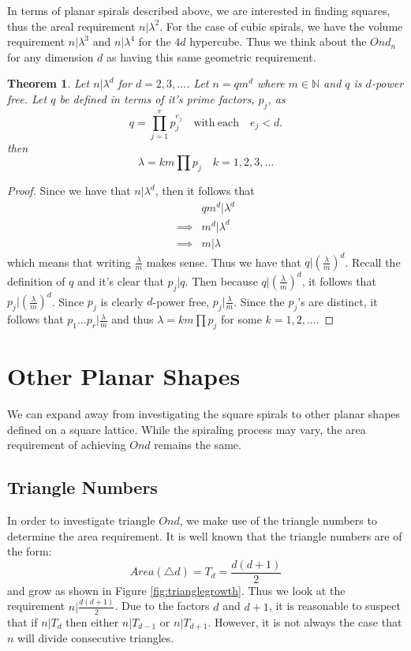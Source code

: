 \documentclass[11pt,reqno]{amsart}
\theoremstyle{mydef}
\newtheorem{thm}{Theorem}[section]
\begin{document}
In terms of planar spirals described above, we are interested
in finding squares, thus the areal requirement $n \vert \lambda^2$. For the case
of cubic spirals, we have the volume requirement $n \vert \lambda^3$ and $n 
\vert \lambda^4$ for the $4d$ hypercube. Thus we think about the $Ond_n$ for any 
dimension $d$ as having this same geometric requirement.

\begin{thm}
\label{dimdthm}
Let $n\vert \lambda^d$ for $d=2, 3, \ldots$. Let $n = qm^d$ where $m \in \mathbb{N}$ and $q$ is $d$-power 
free. Let $q$ be defined in terms of it's prime factors, $p_j$, as
\[
	q = \prod\limits_{j=1}^{r} p_j^{e_j}\quad \text{with}\ \text{each}\quad e_j < d.
\]
then
\[
	\lambda = k m \prod p_j \quad k = 1, 2, 3, \ldots
\]
\end{thm}

\begin{proof}
Since we have that $n \vert \lambda^d$, then it follows that
\begin{align*}
  & qm^d \vert \lambda^d\\
\implies & m^d \vert \lambda^d\\
\implies & m \vert \lambda 
\end{align*}
which means that writing $\frac{\lambda}{m}$ makes sense. Thus we have 
that $q \vert (\frac{\lambda}{m})^d$. Recall the definition of $q$ and it's clear
that $p_j \vert q$. Then because $q \vert (\frac{\lambda}{m})^d$, it follows that
$p_j \vert (\frac{\lambda}{m})^d$.  Since $p_j$ is clearly $d$-power free, $p_j \vert \frac{\lambda}{m}$.
Since the $p_j$'s are distinct, it follows that $p_1 \dots p_r \vert \frac{\lambda}{m}$ 
and thus $\lambda = k m \prod p_j$ for some $k = 1, 2, \ldots$.
\end{proof}

\section{Other Planar Shapes}

We can expand away from investigating the square spirals to other planar shapes
defined on a square lattice. While the spiraling process may vary, the area
requirement of achieving $Ond$ remains the same.

\subsection{Triangle Numbers}

In order to investigate triangle $Ond$, we make use of the triangle numbers \cite{TriangleNumbers}
to determine the area requirement. It is well known that the triangle numbers are of the form:
\[
	Area(\triangle d) =  T_d =  \frac{d(d+1)}{2}
\]
and grow as shown in Figure \ref{fig:trianglegrowth}. Thus we look at the requirement 
$n \vert \frac{d(d+1)}{2}$. Due to the factors $d$ and $d+1$, it is reasonable to suspect
that if $n \vert T_d$ then either $n \vert T_{d-1}$ or $n \vert T_{d+1}$. However, it is not
always the case that $n$ will divide consecutive triangles.
\end{document}
